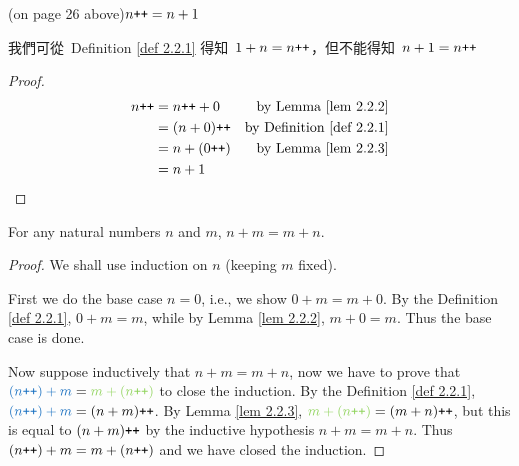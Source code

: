 \begin{additional corollary}\label{ac 2.2.2}(on page 26 above)\(n\texttt{++} = n +1\)
\begin{note}
我們可從\ Definition \ref{def 2.2.1} 得知\ \(1 + n = n\texttt{++}\)，但不能得知\ \(n + 1 = n\texttt{++}\)
\end{note}
\begin{proof}
    \begin{align*}
        n\texttt{++} & = n\texttt{++} + 0 & \text{by Lemma \ref{lem 2.2.2}} \\
              & = (n + 0)\texttt{++} & \text{by Definition \ref{def 2.2.1}} \\
              & = n + (0\texttt{++}) & \text{by Lemma \ref{lem 2.2.3}} \\
              & = n + 1
    \end{align*}
\end{proof}
\end{additional corollary}

\begin{proposition}\label{prop 2.2.4} For any natural numbers \(n\) and \(m\), \(n + m = m + n\).
\end{proposition}
\begin{proof}
We shall use induction on \(n\) (keeping \(m\) fixed).

First we do the base case \(n = 0\), i.e., we show \(0 + m = m + 0\). By the Definition \ref{def 2.2.1}, \(0 + m = m\), while by Lemma \ref{lem 2.2.2}, \(m + 0 = m\). Thus the base case is done.

Now suppose inductively that \(n + m = m + n\), now we have to prove that \(\BLUE{(n\INC) + m} = \GREEN{m +(n\INC)}\) to close the induction. By the Definition \ref{def 2.2.1}, \(\BLUE{(n\INC) + m} = (n + m)\INC\). By Lemma \ref{lem 2.2.3}, \(\GREEN{m + (n\INC)} = (m + n)\INC\), but this is equal to \((n + m)\texttt{++}\) by the inductive hypothesis \(n + m = m + n\). Thus \((n\texttt{++}) + m = m +(n\texttt{++})\) and we have closed the induction.
\end{proof}

